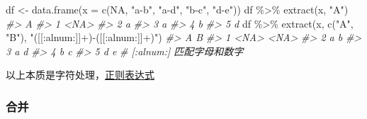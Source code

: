 \documentclass[
]{book}
\newenvironment{Shaded}{\begin{snugshade}}{\end{snugshade}}
\newcommand{\AttributeTok}[1]{\textcolor[rgb]{0.77,0.63,0.00}{#1}}
\newcommand{\CommentTok}[1]{\textcolor[rgb]{0.56,0.35,0.01}{\textit{#1}}}
\newcommand{\ConstantTok}[1]{\textcolor[rgb]{0.00,0.00,0.00}{#1}}
\newcommand{\FunctionTok}[1]{\textcolor[rgb]{0.00,0.00,0.00}{#1}}
\newcommand{\NormalTok}[1]{#1}
\newcommand{\OtherTok}[1]{\textcolor[rgb]{0.56,0.35,0.01}{#1}}
\newcommand{\SpecialCharTok}[1]{\textcolor[rgb]{0.00,0.00,0.00}{#1}}
\newcommand{\StringTok}[1]{\textcolor[rgb]{0.31,0.60,0.02}{#1}}
\begin{document}
\begin{Shaded}
\begin{Highlighting}[]
\NormalTok{df }\OtherTok{\textless{}{-}} \FunctionTok{data.frame}\NormalTok{(}\AttributeTok{x =} \FunctionTok{c}\NormalTok{(}\ConstantTok{NA}\NormalTok{, }\StringTok{"a{-}b"}\NormalTok{, }\StringTok{"a{-}d"}\NormalTok{, }\StringTok{"b{-}c"}\NormalTok{, }\StringTok{"d{-}e"}\NormalTok{))}
\NormalTok{df }\SpecialCharTok{\%\textgreater{}\%} \FunctionTok{extract}\NormalTok{(x, }\StringTok{"A"}\NormalTok{)}
\CommentTok{\#\textgreater{}      A}
\CommentTok{\#\textgreater{} 1 \textless{}NA\textgreater{}}
\CommentTok{\#\textgreater{} 2    a}
\CommentTok{\#\textgreater{} 3    a}
\CommentTok{\#\textgreater{} 4    b}
\CommentTok{\#\textgreater{} 5    d}
\NormalTok{df }\SpecialCharTok{\%\textgreater{}\%} \FunctionTok{extract}\NormalTok{(x, }\FunctionTok{c}\NormalTok{(}\StringTok{"A"}\NormalTok{, }\StringTok{"B"}\NormalTok{), }\StringTok{"([[:alnum:]]+){-}([[:alnum:]]+)"}\NormalTok{)}
\CommentTok{\#\textgreater{}      A    B}
\CommentTok{\#\textgreater{} 1 \textless{}NA\textgreater{} \textless{}NA\textgreater{}}
\CommentTok{\#\textgreater{} 2    a    b}
\CommentTok{\#\textgreater{} 3    a    d}
\CommentTok{\#\textgreater{} 4    b    c}
\CommentTok{\#\textgreater{} 5    d    e}
\CommentTok{\# [:alnum:] 匹配字母和数字}
\end{Highlighting}
\end{Shaded}

以上本质是字符处理，\href{http://baiy.cn/utils/_regex_doc/index.htm}{正则表达式}

\hypertarget{ux5408ux5e76}{%
\subsubsection{合并}\label{ux5408ux5e76}}
\end{document}
